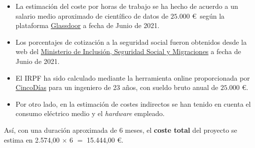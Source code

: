 \begin{itemize}
    \item La estimación del coste por horas de trabajo se ha hecho de acuerdo a un salario medio aproximado de científico de datos de $25.000$ \euro\ según la plataforma \href{https://www.glassdoor.es/}{Glassdoor} a fecha de Junio de 2021.
    \item Los porcentajes de cotización a la seguridad social fueron obtenidos desde la web del \href{https://www.seg-social.es/wps/portal/wss/internet/Trabajadores/CotizacionRecaudacionTrabajadores/36537}{Ministerio de Inclusión, Seguridad Social y Migraciones} a fecha de Junio de 2021.
    \item El IRPF ha sido calculado mediante la herramienta online proporcionada por \href{https://cincodias.elpais.com/herramientas/calculadora-irpf/}{CincoDías} para un ingeniero de 23 años, con sueldo bruto anual de $25.000$ \euro.
    \item Por otro lado, en la estimación de costes indirectos se han tenido en cuenta el consumo eléctrico medio y el \textit{hardware} empleado.
\end{itemize}

Así, con una duración aproximada de 6 meses, el \textbf{coste total} del proyecto se estima en 2.574,00 $\times$ 6 $=$ 15.444,00 \euro.

\begin{table}
    \centering
    \caption{Desglose de gastos del proyecto}
    \label{tb:economico}
\end{table}

